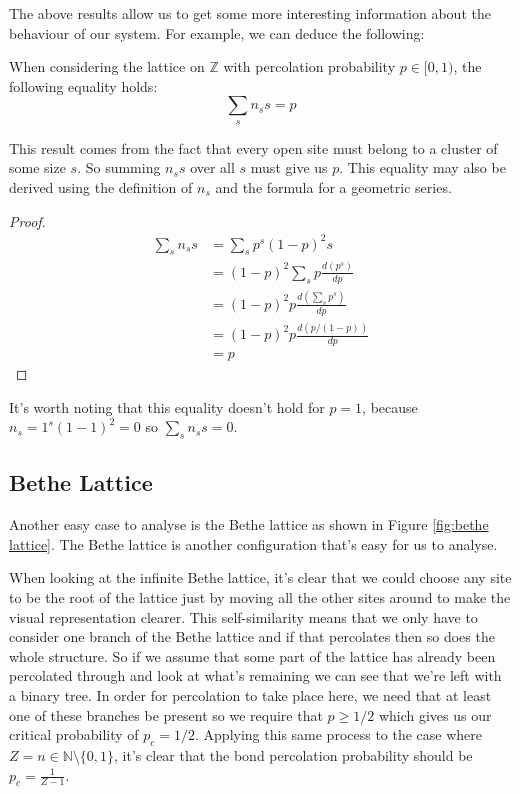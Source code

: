 The above results allow us to get some more interesting information about the behaviour of our system. For example, we can deduce the following:
\begin{corollary}
  When considering the lattice on $\mathbb{Z}$ with percolation probability $p \in [0, 1)$, the following equality holds:
  $$\sum_sn_ss = p$$
\end{corollary}
This result comes from the fact that every open site must belong to a cluster of some size $s$. So summing $n_ss$ over all $s$ must give us $p$. This equality may also be derived
using the definition of $n_s$ and the formula for a geometric series.

\begin{proof}
  \begin{align*}
    \sum_sn_ss &= \sum_sp^s(1-p)^2s \\
    &= (1-p)^2\sum_sp\frac{d(p^s)}{dp} \\
    &= (1-p)^2p\frac{d(\sum_sp^s)}{dp} \\
    &= (1-p)^2p\frac{d(p/(1-p))}{dp} \\
    &= p
  \end{align*}
\end{proof}

It's worth noting that this equality doesn't hold for $p=1$, because $n_s=1^s(1-1)^2=0$ so $\sum_sn_ss = 0$.

\subsection{Bethe Lattice}
Another easy case to analyse is the Bethe lattice as shown in Figure \ref{fig:bethe lattice}. The Bethe lattice is another configuration that's easy for us to analyse.

When looking at the infinite Bethe lattice, it's clear that we could choose any site to be the root of the lattice just by moving all the other sites around to make the visual
representation clearer. This self-similarity means that we only have to consider one branch of the Bethe lattice and if that percolates then so does the whole structure. So if we
assume that some part of the lattice has already been percolated through and look at what's remaining we can see that we're left with a binary tree. In order for percolation to
take place here, we need that at least one of these branches be present so we require that $p \geq 1/2$ which gives us our critical probability of $p_c = 1/2$. Applying this same
process to the case where $Z = n \in \mathbb{N}\setminus \{0, 1\}$, it's clear that the bond percolation probability should be $p_c = \frac{1}{Z-1}$.


